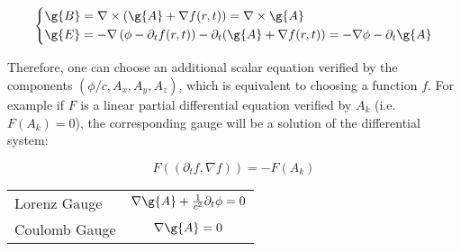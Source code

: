 \begin{equation}
  \left\{
      \begin{aligned}
     &  \g{B}= \nabla \times (\g{A}+ \nabla f(r,t)) = \nabla \times \g{A}\\
     & \g{E}= - \nabla \left( \phi -\partial_tf(r,t)\right) - \partial_t (\g{A}+ \nabla f(r,t)) =- \nabla \phi - \partial_t \g{A} \\
      \end{aligned}
    \right.
\end{equation}

\noindent Therefore, one can choose an additional scalar equation verified by the components $(\phi/c,A_x,A_y,A_z)$, which is equivalent to choosing a function $f$. For example if $F$ is a linear 
partial differential equation verified by $A_k$ (i.e. $F(A_k) = 0$), the corresponding gauge will be a solution of the differential system:

\begin{equation}
F((\partial_t f, \nabla f)) =- F(A_k) 
\end{equation}

\begin{center}
\begin{tabular}{p{5cm}c}
Lorenz Gauge& $\nabla \g{A}+ \frac{1}{c^2}\partial_{t}\phi = 0$\\
Coulomb Gauge & $\nabla \g{A} = 0$ \\
\end{tabular}
\end{center}




